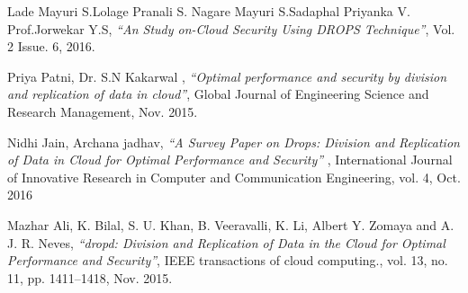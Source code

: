 
\begin{thebibliography}{99}



 Lade Mayuri S.Lolage Pranali S. Nagare Mayuri S.Sadaphal Priyanka V. Prof.Jorwekar Y.S, \textit{``An Study on-Cloud Security Using DROPS Technique''}, Vol. 2 Issue. 6, 2016.

 Priya Patni, Dr. S.N Kakarwal , \textit{``Optimal performance and security by division and replication of data in cloud''},  Global Journal of Engineering Science and Research Management, Nov. 2015.
 
Nidhi Jain, Archana jadhav, \textit{``A Survey Paper on Drops: Division and Replication of Data in Cloud for Optimal Performance and Security'' }, International Journal of Innovative Research in Computer
and Communication Engineering, vol. 4, Oct. 2016

Mazhar Ali, K. Bilal, S. U. Khan, B. Veeravalli, K. Li, Albert Y. Zomaya and A. J. R. Neves, \textit{``dropd: Division and Replication of Data in the Cloud for Optimal Performance and Security''}, IEEE transactions of cloud computing., vol. 13, no. 11, pp. 1411–1418, Nov. 2015.

\end{thebibliography}

